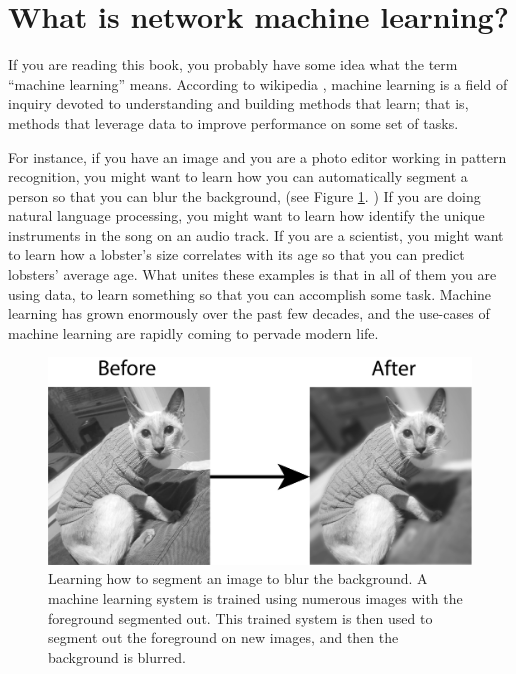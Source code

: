 \section{What is network machine learning?}
\label{sec:ch1:whatis}

If you are reading this book, you probably have some idea what the term ``machine learning'' means. According to wikipedia \cite{wikiML}, machine learning is a field of inquiry devoted to understanding and building methods that {learn}; that is, methods that leverage data to improve performance on some set of tasks.

For instance, if you have an image and you are a photo editor working in pattern recognition, you might want to learn how you can automatically segment a person so that you can blur the background, (see Figure \ref{fig:ch1:ml-ex}. ) If you are doing natural language processing, you might want to learn how identify the unique instruments in the song on an audio track. If you are a scientist, you might want to learn how a lobster's size correlates with its age so that you can predict lobsters' average age.  What unites these examples is that in all of them you are using data,  to learn something so that you can accomplish some task. Machine learning has grown enormously over the past few decades, and the use-cases of machine learning are rapidly coming to pervade modern life.

\begin{figure}[h]
    \centering
    \includegraphics[width=\linewidth]{foundations/ch1/Images/cboy.png}
    \caption[Machine learning task]{Learning how to segment an image to blur the background. A machine learning system is trained using numerous images with the foreground segmented out. This trained system is then used to segment out the foreground on new images, and then the background is blurred.}
    \label{fig:ch1:ml-ex}
\end{figure}


